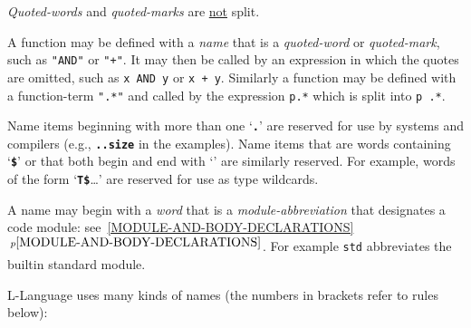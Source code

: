 \documentclass[12pt]{article}
\newcommand{\TT}[1]{{\tt \bfseries #1}}
\newcommand{\itemref}[1]{\ref{#1}$\,^{p\pageref{#1}}$}
\begin{document}
{\em Quoted-words} and {\em quoted-marks} are \underline{not} split.

A function may be defined with a {\em name} that is a {\em quoted-word}
or {\em quoted-mark},
such as {\tt "AND"} or {\tt "+"}.
It may then be called by an expression in which the
quotes are omitted, such as {\tt x AND y} or {\tt x + y}.
Similarly a function may be
defined with a function-term {\tt ".*"} and called by the expression
{\tt p.*} which is split into {\tt p .*}.


Name items beginning with more than one `\TT{.}' are reserved
for use by systems and compilers (e.g., \TT{..size} in the examples).
Name items that are words containing `\TT{\$}' or that both
begin and end with `\TT{*}' are
similarly reserved.  For example, words of the form `\TT{T\$}\ldots'
are reserved for use as type wildcards.

A name may begin with a {\em word} that is a {\em module-abbreviation}
that designates a code module: see~\itemref{MODULE-AND-BODY-DECLARATIONS}.
For example {\tt std} abbreviates the builtin standard module.

L-Language uses many kinds of names (the numbers in brackets refer to
rules below):
\end{document}

